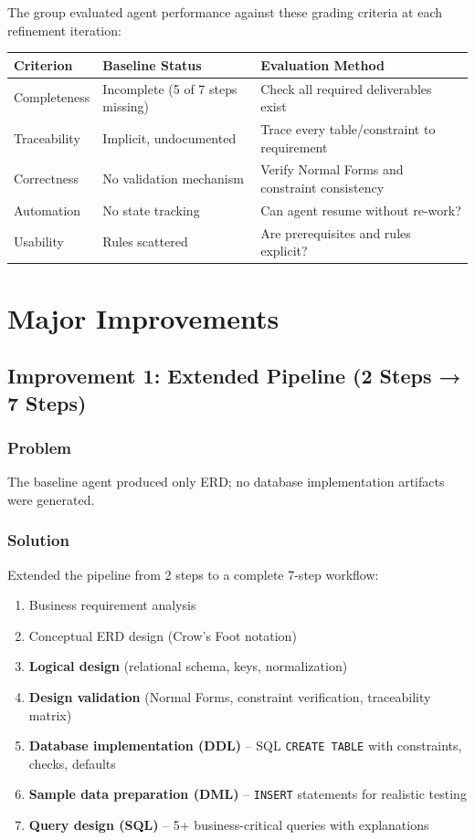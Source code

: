 \documentclass[12pt,a4paper]{article}
\begin{document}
The group evaluated agent performance against these grading criteria at each refinement iteration:

\begin{table}[h]
\centering
\begin{tabular}{|p{3cm}|p{4cm}|p{4cm}|}
\hline
\textbf{Criterion} & \textbf{Baseline Status} & \textbf{Evaluation Method} \\
\hline
Completeness & Incomplete (5 of 7 steps missing) & Check all required deliverables exist \\
\hline
Traceability & Implicit, undocumented & Trace every table/constraint to requirement \\
\hline
Correctness & No validation mechanism & Verify Normal Forms and constraint consistency \\
\hline
Automation & No state tracking & Can agent resume without re-work? \\
\hline
Usability & Rules scattered & Are prerequisites and rules explicit? \\
\hline
\end{tabular}
\end{table}

\newpage

\section{Major Improvements}

\subsection{Improvement 1: Extended Pipeline (2 Steps → 7 Steps)}

\subsubsection{Problem}
The baseline agent produced only ERD; no database implementation artifacts were generated.

\subsubsection{Solution}
Extended the pipeline from 2 steps to a complete 7-step workflow:

\begin{enumerate}
    \item Business requirement analysis
    \item Conceptual ERD design (Crow's Foot notation)
    \item \textbf{Logical design} (relational schema, keys, normalization)
    \item \textbf{Design validation} (Normal Forms, constraint verification, traceability matrix)
    \item \textbf{Database implementation (DDL)} -- SQL \texttt{CREATE TABLE} with constraints, checks, defaults
    \item \textbf{Sample data preparation (DML)} -- \texttt{INSERT} statements for realistic testing
    \item \textbf{Query design (SQL)} -- 5+ business-critical queries with explanations
\end{enumerate}
\end{document}

